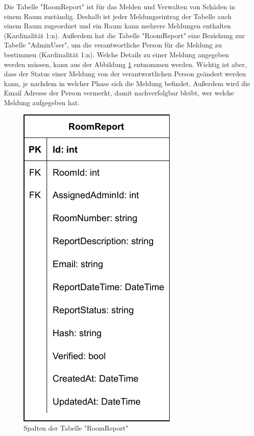 
Die Tabelle "RoomReport" ist für das Melden und Verwalten von Schäden in einem Raum zuständig. Deshalb ist jeder Meldungseintrag der Tabelle auch einem Raum zugeordnet und ein Raum kann mehrere Meldungen enthalten (Kardinalität 1:n). Außerdem hat die Tabelle "RoomReport" eine Beziehung zur Tabelle "AdminUser",  um die verantwortliche Person für die Meldung zu bestimmen (Kardinalität 1:n). Welche Details zu einer Meldung angegeben werden müssen, kann aus der Abbildung \ref{fig:RoomReportColls} entnommen werden. Wichtig ist aber, dass der Status einer Meldung von der verantwortlichen Person geändert werden kann, je nachdem in welcher Phase sich die Meldung befindet. Außerdem wird die Email Adresse der Person vermerkt, damit nachverfolgbar bleibt, wer welche Meldung aufgegeben hat.

\begin{figure}[H]
    \centering
    \includegraphics{media/MariaDB/RoomReport.svg.pdf}
    \caption{Spalten der Tabelle "RoomReport"}
    \label{fig:RoomReportColls}
\end{figure}

